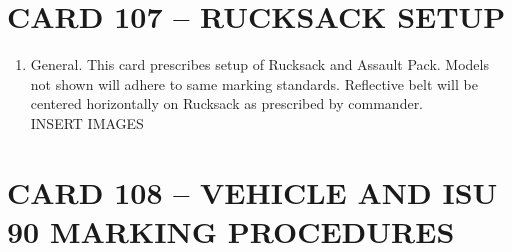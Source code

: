 \documentclass{article}
\begin{document}
\newpage
\section*{CARD 107 – RUCKSACK SETUP}
\begin{enumerate}
    \item General. This card prescribes setup of Rucksack and Assault Pack. Models not shown will adhere to same marking standards. Reflective belt will be centered horizontally on Rucksack as prescribed by commander.
\\
INSERT IMAGES
\end{enumerate}

\newpage
\section*{CARD 108 – VEHICLE AND ISU 90 MARKING PROCEDURES}
\end{document}

